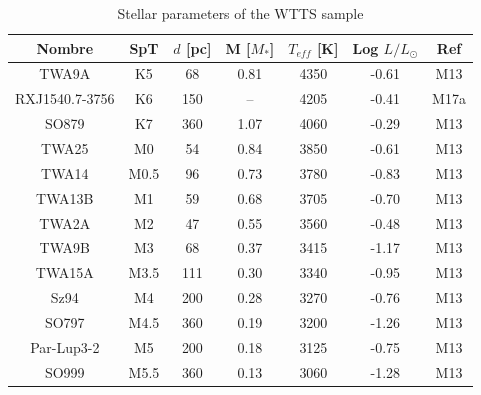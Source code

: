 \documentclass[twocolumn,linenumbers]{aastex631}
\begin{document}
\begin{table}[]
\caption{Stellar parameters of the WTTS sample}
\centering

\begin{tabular}{ccccccc}
\hline
Nombre          & SpT  & $d$ {[}pc{]} & M {[}$M_*${]} & $T_{eff}$ {[}K{]} & Log $L/L_{\odot}$ & Ref  \\ \hline
TWA9A          & K5   & 68           & 0.81          & 4350              & -0.61             & M13  \\
RXJ1540.7-3756 & K6   & 150          & --            & 4205              & -0.41             & M17a \\
SO879          & K7   & 360          & 1.07          & 4060              & -0.29             & M13  \\
TWA25          & M0   & 54           & 0.84          & 3850              & -0.61             & M13  \\
TWA14          & M0.5 & 96           & 0.73          & 3780              & -0.83             & M13  \\
TWA13B         & M1   & 59           & 0.68          & 3705              & -0.70             & M13  \\
TWA2A          & M2   & 47           & 0.55          & 3560              & -0.48             & M13  \\
TWA9B          & M3   & 68           & 0.37          & 3415              & -1.17             & M13  \\
TWA15A         & M3.5 & 111          & 0.30          & 3340              & -0.95             & M13  \\
Sz94           & M4   & 200          & 0.28          & 3270              & -0.76             & M13  \\
SO797          & M4.5 & 360          & 0.19          & 3200              & -1.26             & M13  \\
Par-Lup3-2     & M5   & 200          & 0.18          & 3125              & -0.75             & M13  \\
SO999          & M5.5 & 360          & 0.13          & 3060              & -1.28             & M13  \\ \hline
\end{tabular}

    \label{SP WTTS}
\end{table}
 
\end{document}
